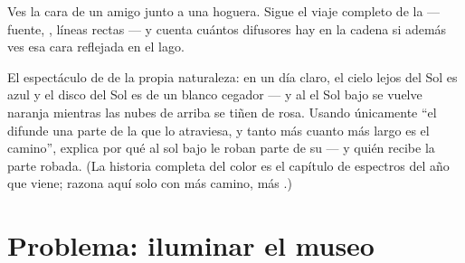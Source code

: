 \begin{exercise}[$\star\star$]\label{exo:g7:light-sources-propagation:11}
Ves la cara de un amigo junto a una hoguera. Sigue el viaje completo
de la  --- fuente, , líneas rectas --- y cuenta
cuántos difusores hay en la cadena si además ves esa cara reflejada en
el lago.
\end{exercise}

\begin{exercise}[$\star\star\star$]\label{exo:g7:light-sources-propagation:12}
El espectáculo de  de la propia naturaleza: en un día claro, el
cielo lejos del Sol es azul y el disco del Sol es de un blanco cegador
--- y al  el Sol bajo se vuelve naranja mientras las nubes de
arriba se tiñen de rosa. Usando únicamente ``el  difunde una
parte de la  que lo atraviesa, y tanto más cuanto más largo es el
camino'', explica por qué al sol bajo le roban parte de su  ---
y quién recibe la parte robada. (La historia completa del color es el
capítulo de espectros del año que viene; razona aquí solo con más
camino, más .)
\end{exercise}

\section{Problema: iluminar el museo}

